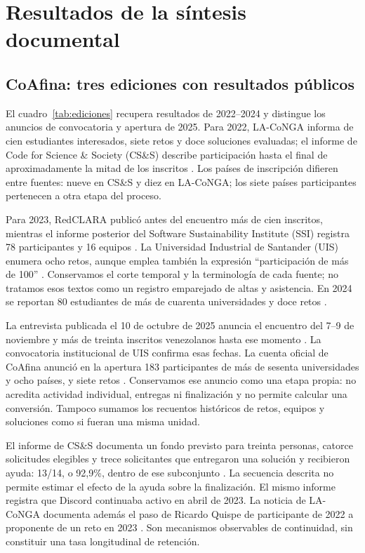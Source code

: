 \section{Resultados de la síntesis documental}
\subsection{CoAfina: tres ediciones con resultados públicos}
El cuadro~\ref{tab:ediciones} recupera resultados de 2022--2024 y distingue los anuncios de convocatoria y apertura de 2025. Para 2022, LA-CoNGA informa de cien estudiantes interesados, siete retos y doce soluciones evaluadas; el informe de Code for Science \& Society (CS\&S) describe participación hasta el final de aproximadamente la mitad de los inscritos \cite{coafina2022}. Los países de inscripción difieren entre fuentes: nueve en CS\&S y diez en LA-CoNGA; los siete países participantes pertenecen a otra etapa del proceso.

Para 2023, RedCLARA publicó antes del encuentro más de cien inscritos, mientras el informe posterior del Software Sustainability Institute (SSI) registra 78 participantes y 16 equipos \cite{coafina2023pre,coafina}. La Universidad Industrial de Santander (UIS) enumera ocho retos, aunque emplea también la expresión ``participación de más de 100'' \cite{uis2023}. Conservamos el corte temporal y la terminología de cada fuente; no tratamos esos textos como un registro emparejado de altas y asistencia. En 2024 se reportan 80 estudiantes de más de cuarenta universidades y doce retos \cite{coafina2024}.



La entrevista publicada el 10 de octubre de 2025 anuncia el encuentro del 7--9 de noviembre y más de treinta inscritos venezolanos hasta ese momento \cite{coafina2025}. La convocatoria institucional de UIS confirma esas fechas. La cuenta oficial de CoAfina anunció en la apertura 183 participantes de más de sesenta universidades y ocho países, y siete retos \cite{uis2025,coafina2025apertura}. Conservamos ese anuncio como una etapa propia: no acredita actividad individual, entregas ni finalización y no permite calcular una conversión. Tampoco sumamos los recuentos históricos de retos, equipos y soluciones como si fueran una misma unidad.

El informe de CS\&S documenta un fondo previsto para treinta personas, catorce solicitudes elegibles y trece solicitantes que entregaron una solución y recibieron ayuda: 13/14, o 92,9\%, dentro de ese subconjunto \cite{coafina2022}. La secuencia descrita no permite estimar el efecto de la ayuda sobre la finalización. El mismo informe registra que Discord continuaba activo en abril de 2023. La noticia de LA-CoNGA documenta además el paso de Ricardo Quispe de participante de 2022 a proponente de un reto en 2023 \cite{coafinacontinuidad}. Son mecanismos observables de continuidad, sin constituir una tasa longitudinal de retención.

